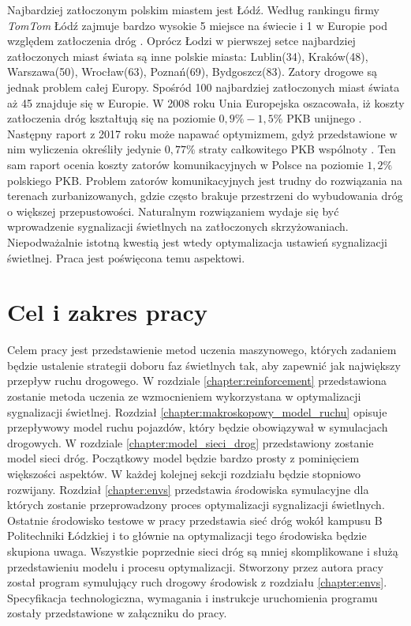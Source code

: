 \documentclass[12pt]{book}
\theoremstyle{plain}
\begin{document}
Najbardziej zatłoczonym polskim miastem jest Łódź. Według rankingu firmy \textit{TomTom } Łódź zajmuje bardzo wysokie 5 miejsce na świecie i 1 w Europie pod względem zatłoczenia dróg \cite{rankingTomTom}. Oprócz Łodzi w pierwszej setce najbardziej zatłoczonych miast świata są inne polskie miasta: Lublin(34), Kraków(48), Warszawa(50), Wrocław(63), Poznań(69), Bydgoszcz(83). Zatory drogowe są jednak problem całej Europy. Spośród 100 najbardziej zatłoczonych miast świata aż 45 znajduje się w Europie. W 2008 roku Unia Europejska oszacowała, iż koszty zatłoczenia dróg kształtują się na poziomie $0,9\%-1,5\%$ PKB unijnego \cite{ue2008}. Następny raport z 2017 roku może napawać optymizmem, gdyż przedstawione w nim wyliczenia określiły jedynie $0,77\%$ straty całkowitego PKB wspólnoty \cite{ue2017}. Ten sam raport ocenia koszty zatorów komunikacyjnych w Polsce na poziomie $1,2\%$ polskiego PKB.
Problem zatorów komunikacyjnych jest trudny do rozwiązania na terenach zurbanizowanych, gdzie często brakuje przestrzeni do wybudowania dróg o większej przepustowości. Naturalnym rozwiązaniem wydaje się być wprowadzenie sygnalizacji świetlnych na zatłoczonych skrzyżowaniach. Niepodważalnie istotną kwestią jest wtedy optymalizacja ustawień sygnalizacji świetlnej. Praca jest poświęcona temu aspektowi.

\chapter{Cel i zakres pracy} \label{sec:cel_zakres_pracy}
Celem pracy jest przedstawienie metod uczenia maszynowego, których zadaniem będzie ustalenie strategii doboru faz świetlnych tak, aby zapewnić jak największy przepływ ruchu drogowego. W rozdziale \ref{chapter:reinforcement} przedstawiona zostanie metoda uczenia ze wzmocnieniem wykorzystana w optymalizacji sygnalizacji świetlnej. Rozdział \ref{chapter:makroskopowy_model_ruchu} opisuje przepływowy model ruchu pojazdów, który będzie obowiązywał w symulacjach drogowych. W rozdziale \ref{chapter:model_sieci_drog} przedstawiony zostanie model sieci dróg. Początkowy model będzie bardzo prosty z pominięciem większości aspektów. W każdej kolejnej sekcji rozdziału będzie stopniowo rozwijany. Rozdział \ref{chapter:envs} przedstawia środowiska symulacyjne dla których zostanie przeprowadzony proces optymalizacji sygnalizacji świetlnych. Ostatnie środowisko testowe w pracy przedstawia sieć dróg wokół kampusu B Politechniki Łódzkiej i to głównie na optymalizacji tego środowiska będzie skupiona uwaga. Wszystkie poprzednie sieci dróg są mniej skomplikowane i służą przedstawieniu modelu i procesu optymalizacji. Stworzony przez autora pracy został program symulujący ruch drogowy środowisk z rozdziału \ref{chapter:envs}. Specyfikacja technologiczna, wymagania i instrukcje uruchomienia programu zostały przedstawione w załączniku do pracy.
\end{document}
